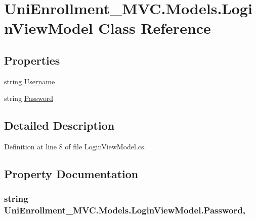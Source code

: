 \hypertarget{class_uni_enrollment___m_v_c_1_1_models_1_1_login_view_model}{}\section{Uni\+Enrollment\+\_\+\+M\+V\+C.\+Models.\+Login\+View\+Model Class Reference}
\label{class_uni_enrollment___m_v_c_1_1_models_1_1_login_view_model}
\subsection*{Properties}
\begin{DoxyCompactItemize}
\item 
string \hyperlink{class_uni_enrollment___m_v_c_1_1_models_1_1_login_view_model_a2a2dfafa311682f75f090f507feede8b}{Username}
\item 
string \hyperlink{class_uni_enrollment___m_v_c_1_1_models_1_1_login_view_model_aaded43b1c35aceeb4a2114a4ad97d5e7}{Password}
\end{DoxyCompactItemize}


\subsection{Detailed Description}


Definition at line 8 of file Login\+View\+Model.\+cs.



\subsection{Property Documentation}
\subsubsection[{\texorpdfstring{Password}{Password}}]{\setlength{\rightskip}{0pt plus 5cm}string Uni\+Enrollment\+\_\+\+M\+V\+C.\+Models.\+Login\+View\+Model.\+Password\hspace{0.3cm}{\ttfamily [get]}, {\ttfamily [set]}}\hypertarget{class_uni_enrollment___m_v_c_1_1_models_1_1_login_view_model_aaded43b1c35aceeb4a2114a4ad97d5e7}{}\label{class_uni_enrollment___m_v_c_1_1_models_1_1_login_view_model_aaded43b1c35aceeb4a2114a4ad97d5e7}


